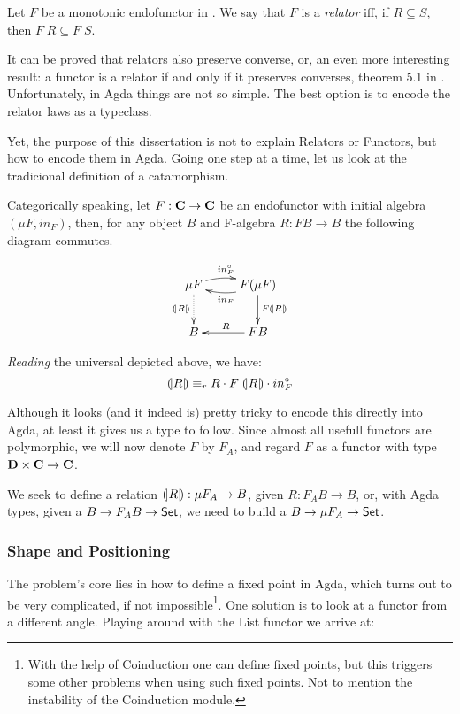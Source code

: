 \begin{mydef}[Relator]
Let $F$ be a monotonic endofunctor in . We say that $F$ is a \emph{relator}
iff, if $R \subseteq S$, then $F\;R \subseteq F\;S$.
\end{mydef}

It can be proved that relators also preserve converse, or, an even more interesting result: a functor
is a relator if and only if it preserves converses, theorem 5.1 in \cite{Bird97}. Unfortunately,
in Agda things are not so simple. The best option is to encode the relator laws as a typeclass.


Yet, the purpose of this dissertation is not to explain Relators or Functors, but how to encode them
in Agda. Going one step at a time, let us look at the tradicional definition of a catamorphism.

Categorically speaking, let $F : \textbf{C} \rightarrow \textbf{C}$ be an endofunctor with
initial algebra $(\mu F , in_F)$, then, for any object $B$ and F-algebra $R : F B \rightarrow B$
the following diagram commutes.

\begin{displaymath}
\xymatrix{%
  \mu F \ar@/^/[r]^{in_F^\circ} \ar@{..>}[d]_{\scata{R}}
     & F (\mu F) \ar@/^/[l]^{in_F} \ar[d]^{F \scata{R}} \\
  B     & \ar[l]_{R} F B
}
\end{displaymath}

\emph{Reading} the universal depicted above, we have:
\[ \mathopen{(\!|}R\mathclose{|\!)} \equiv_r R \cdot F\;\mathopen{(\!|}R\mathclose{|\!)} \cdot in_F^\circ \]

Although it looks (and it indeed is) pretty tricky to encode this directly into Agda, at least it gives
us a type to follow. Since almost all usefull functors are polymorphic, we will now
denote $F$ by $F_A$, and regard $F$ as a functor with type $\textbf{D} \times \textbf{C} \rightarrow \textbf{C}$.

We seek to define a relation $\mathopen{(\!|}R\mathclose{|\!)} : \mu F_A \rightarrow B$, given $R : F_A B \rightarrow B$,
or, with Agda types, given a $B \rightarrow F_A B \rightarrow \D{Set}$, we need to build a $B \rightarrow \mu F_A \rightarrow \D{Set}$.

\subsubsection{Shape and Positioning}

The problem's core lies in how to define a fixed point in Agda, which turns out 
to be very complicated, if not impossible\footnote{%
With the help of Coinduction one can define fixed points, but this triggers some other
problems when using such fixed points. Not to mention the instability of the Coinduction module.
}. One solution is to look at a functor from a different angle. Playing around with
the List functor we arrive at:

